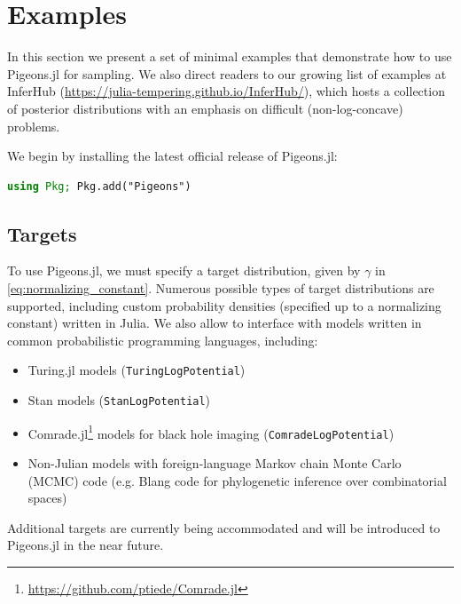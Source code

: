 \section{Examples}
In this section we present a set of minimal examples 
that demonstrate how to use Pigeons.jl for sampling. 
We also direct readers to our growing list of examples at InferHub 
(\url{https://julia-tempering.github.io/InferHub/}), which hosts a  collection of posterior 
distributions with an emphasis on difficult (non-log-concave) problems.


We begin by installing the latest official release of Pigeons.jl: 
\begin{lstlisting}[language = Julia]
using Pkg; Pkg.add("Pigeons")
\end{lstlisting}


\subsection{Targets}
To use Pigeons.jl, we must specify a target distribution, given by $\gamma$ 
in \cref{eq:normalizing_constant}.
Numerous possible types of target distributions are supported, including 
custom probability densities (specified up to a normalizing constant) written in Julia.
We also allow to interface with models written in common probabilistic programming 
languages, including:
\begin{itemize}
    \item Turing.jl \cite{ge2018turing} models (\texttt{TuringLogPotential})
    \item Stan \cite{carpenter2017stan} models (\texttt{StanLogPotential})
    \item Comrade.jl\footnote{\url{https://github.com/ptiede/Comrade.jl}} 
      models for black hole imaging (\texttt{ComradeLogPotential})
    \item Non-Julian models with foreign-language Markov chain Monte Carlo (MCMC) code 
    (e.g. Blang \cite{bouchard2022blang} code for phylogenetic inference over combinatorial spaces) 
\end{itemize}
Additional targets are currently being accommodated and will be 
introduced to Pigeons.jl in the near future.

